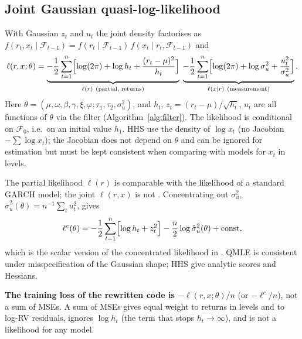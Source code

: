 \documentclass[11pt]{article}
\newcommand{\F}{\mathcal{F}}
\begin{document}
\subsection{Joint Gaussian quasi-log-likelihood}
With Gaussian $z_t$ and $u_t$ the joint density factorises as
$f(r_t,x_t\mid\F_{t-1})=f(r_t\mid\F_{t-1})\,f(x_t\mid r_t,\F_{t-1})$ and \cite{HHS2012}
\begin{equation}\label{eq:ll-joint}
\ell(r,x;\theta) = \underbrace{-\frac12\sum_{t=1}^n\Bigl[\log(2\pi)+\log h_t+\frac{(r_t-\mu)^2}{h_t}\Bigr]}_{\ell(r)\ \text{(partial, returns)}}
\;\underbrace{-\frac12\sum_{t=1}^n\Bigl[\log(2\pi)+\log\sigma_u^2+\frac{u_t^2}{\sigma_u^2}\Bigr]}_{\ell(x\mid r)\ \text{(measurement)}} .
\end{equation}
Here $\theta=(\mu,\omega,\beta,\gamma,\xi,\varphi,\tau_1,\tau_2,\sigma_u^2)$, and $h_t$,
$z_t=(r_t-\mu)/\sqrt{h_t}$, $u_t$ are all functions of $\theta$ via the filter
(Algorithm~\ref{alg:filter}). The likelihood is conditional on $\F_0$, i.e.\ on an initial
value $h_1$. HHS use the density of $\log x_t$ (no Jacobian $-\sum\log x_t$); the Jacobian
does not depend on $\theta$ and can be ignored for estimation but must be kept consistent
when comparing with models for $x_t$ in levels.

The partial likelihood $\ell(r)$ is comparable with the likelihood of a standard GARCH model;
the joint $\ell(r,x)$ is not \cite{HHS2012}. Concentrating out $\sigma_u^2$,
$\hat\sigma_u^2(\theta)=n^{-1}\sum_t u_t^2$, gives
\begin{equation}\label{eq:ll-conc}
\ell^c(\theta) = -\frac12\sum_{t=1}^n\Bigl[\log h_t + z_t^2\Bigr] - \frac n2\log\hat\sigma_u^2(\theta) + \text{const},
\end{equation}
which is the scalar version of the concentrated likelihood in \cite{HH2016}. QMLE is
consistent under misspecification of the Gaussian shape; HHS give analytic scores and Hessians.

\textbf{The training loss of the rewritten code is $-\ell(r,x;\theta)/n$} (or
$-\ell^c/n$), not a sum of MSEs. A sum of MSEs gives equal weight to returns in levels and
to log-RV residuals, ignores $\log h_t$ (the term that stops $h_t\to\infty$), and is not a
likelihood for any model.

\end{document}
